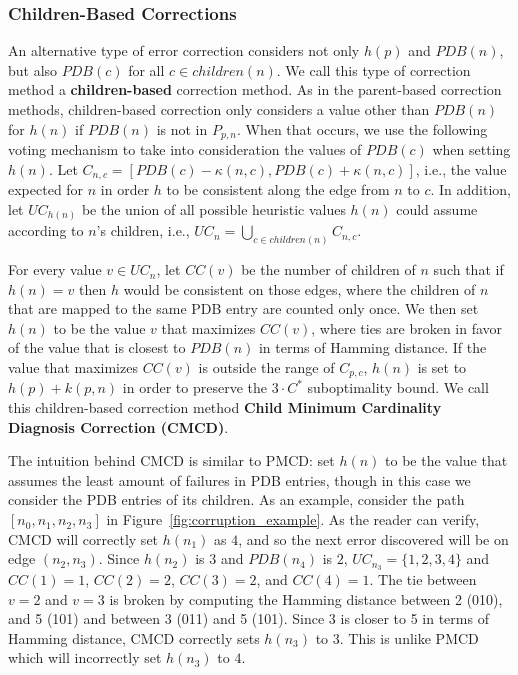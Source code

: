 \documentclass[letterpaper]{article}
\begin{document}
\subsubsection{Children-Based Corrections}

An alternative type of error correction considers not only $h(p)$ and $PDB(n)$, but also $PDB(c)$ for all $c \in children(n)$. We call this type of correction method a \textbf{children-based} correction method. 
%
As in the parent-based correction methods, children-based correction only considers a value other than $PDB(n)$ for $h(n)$ if $PDB(n)$ is not in $P_{p,n}$. When that occurs, we use the following voting mechanism to take into consideration the values of $PDB(c)$ when setting $h(n)$. 
Let $C_{n,c}=[PDB(c)-\kappa(n,c),PDB(c)+\kappa(n,c)]$, i.e., the value expected for $n$ in order $h$ to be consistent along the edge from $n$ to $c$. In addition, let $UC_{h(n)}$ be the union of all possible heuristic values $h(n)$ could assume according to $n$'s children, i.e., $UC_n = \bigcup_{c \in children(n)} C_{n,c}$.

For every value $v\in UC_n$, let $CC(v)$ be the number of children of $n$ such that if $h(n)=v$ then $h$ would be consistent on those edges, where the children of $n$ that are mapped to the same PDB entry are counted only once. We then set $h(n)$ to be the value $v$ that maximizes $CC(v)$, where ties are broken in favor of the value that is closest to $PDB(n)$ in terms of Hamming distance.
If the value that maximizes $CC(v)$ is outside the range of $C_{p,c}$, $h(n)$ is set to $h(p) + k(p, n)$ in order to preserve the $3 \cdot C^*$ suboptimality bound.
We call this children-based correction method \textbf{Child Minimum Cardinality Diagnosis Correction (CMCD)}. 

The intuition behind CMCD is similar to PMCD: set $h(n)$ to be the value that assumes the least amount of failures in PDB entries, though in this case we consider the PDB entries of its children. 
As an example, consider the path $[n_0, n_1, n_2, n_3]$ in Figure~\ref{fig:corruption_example}.
As the reader can verify, CMCD will correctly set $h(n_1)$ as $4$, and so the next error discovered will be on edge $(n_2, n_3)$. 
Since $h(n_2)$ is $3$  and $PDB(n_4)$ is $2$, $UC_{n_3} = \{1, 2, 3, 4\}$ and $CC(1)=1$, $CC(2)=2$, $CC(3)=2$, and $CC(4)=1$.
The tie between $v=2$ and $v=3$ is broken by computing the Hamming distance between 2 (010), and 5 (101) and between 3 (011) and 5 (101). Since 3 is closer to 5 in terms of Hamming distance, CMCD correctly sets $h(n_3)$ to $3$.
This is unlike PMCD which will incorrectly set $h(n_3)$ to $4$.
\end{document}
